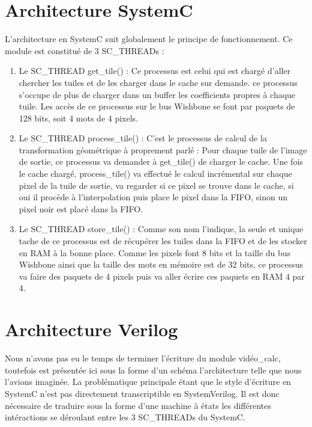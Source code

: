 \documentclass[a4paper,12pt]{report}
\begin{document}
{{\begin{enumerate}
                               \end{enumerate}

	                       \section{Architecture SystemC}
                               L'architecture en SystemC suit globalement le principe de fonctionnement. Ce module est constitué de 3 SC\_THREADs :

                               \begin{enumerate}

                               \item Le SC\_THREAD get\_tile() : Ce processus est celui qui est chargé d'aller chercher les tuiles et de les charger dans le cache sur demande. ce processus s'occupe de plus de charger dans un buffer les coefficients propres à chaque tuile. Les accès de ce processus sur le bus Wishbone se font par paquets de 128 bits, soit 4 mots de 4 pixels.


                               \item Le SC\_THREAD process\_tile() : C'est le processus de calcul de la transformation géométrique à proprement parlé : Pour chaque tuile de l'image de sortie, ce processus va demander à get\_tile() de charger le cache. Une fois le cache chargé, process\_tile() va effectué le calcul incrémental sur chaque pixel de la tuile de sortie, va regarder si ce pixel se trouve dans le cache, si oui il procède à l'interpolation puis place le pixel dans la FIFO, sinon un pixel noir est placé dans la FIFO.


                               \item Le SC\_THREAD store\_tile() : Comme son nom l'indique, la seule et unique tache de ce processus est de récupérer les tuiles dans la FIFO et de les stocker en RAM à la bonne place. Comme les  pixels font 8 bits et la taille du bus Wishbone ainsi que la taille des mots en mémoire  est de 32 bits, ce processus va faire des paquets de 4 pixels puis va aller écrire ces paquets en RAM 4 par 4.
                               \end{enumerate}

	                       \section{Architecture Verilog}
                               Nous n'avons pas eu le temps de terminer l'écriture du module vidéo\_calc, toutefois est présentée ici sous la forme d'un schéma l'architecture telle que nous l'avions imaginée. La problématique principale étant que le style d'écriture en SystemC n'est pas directement transcriptible en SystemVerilog. Il est donc nécessaire de traduire sous la forme d'une machine à états les différentes intéractions se déroulant entre les 3 SC\_THREADs du SystemC.

}}
\end{document}

